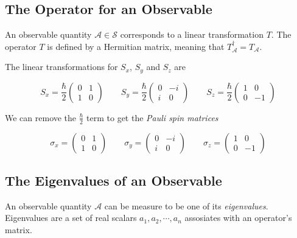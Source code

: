 \documentclass{article}
\begin{document}
\subsection{The Operator for an Observable}

An observable quantity \(\mathcal{A} \in \mathscr{S}\) corresponds to a linear
transformation \(T\). The operator \(T\) is defined by a Hermitian matrix, meaning that
\(T_\mathcal{A}^{\dagger}=T_\mathcal{A}\).

The linear transformations for \(S_x\), \(S_y\) and \(S_z\) are

\[
    S_x = \frac{\hbar}{2}
    \begin{pmatrix}
        0 & 1 \\
        1 & 0
    \end{pmatrix}
    \quad\quad
    S_y = \frac{\hbar}{2}
    \begin{pmatrix}
        0 & -i \\
        i & 0
    \end{pmatrix}
    \quad\quad
    S_z = \frac{\hbar}{2}
    \begin{pmatrix}
        1 & 0 \\
        0 & -1
    \end{pmatrix}
\]

We can remove the \(\frac{\hbar}{2}\) term to get the \textit{Pauli spin matrices}

\[
    \sigma_x =
    \begin{pmatrix}
        0 & 1 \\
        1 & 0
    \end{pmatrix}
    \quad\quad
    \sigma_y =
    \begin{pmatrix}
        0 & -i \\
        i & 0
    \end{pmatrix}
    \quad\quad
    \sigma_z =
    \begin{pmatrix}
        1 & 0 \\
        0 & -1
    \end{pmatrix}
\]

\pagebreak

\subsection{The Eigenvalues of an Observable}

An observable quantity \(\mathcal{A}\) can be measure to be one of its \textit{eigenvalues}.
Eigenvalues are a set of real scalars \(a_1, a_2, \cdots , a_n\) assosiates with
an operator's matrix.
\end{document}
